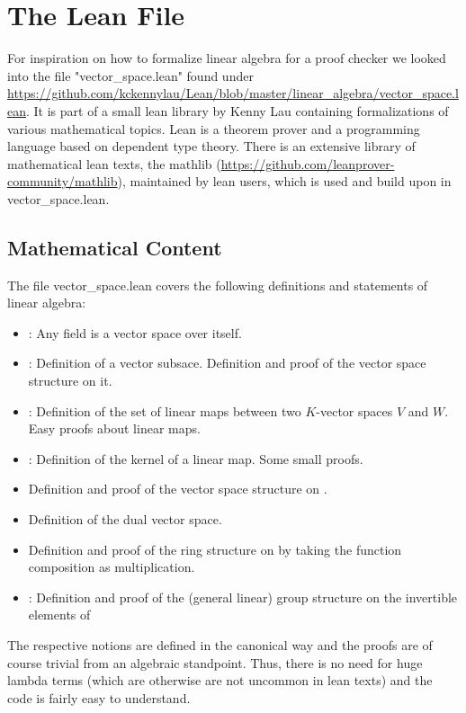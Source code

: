 \documentclass[11pt]{article}
\begin{document}
\newpage

\section{The Lean File}
For inspiration on how to formalize linear algebra for a proof checker we looked into the file "vector\_space.lean" found under \url{https://github.com/kckennylau/Lean/blob/master/linear_algebra/vector_space.lean}. It is part of a small lean library by Kenny Lau containing formalizations of various mathematical topics. Lean is a theorem prover and a programming language based on dependent type theory. There is an extensive library of mathematical lean texts, the mathlib (\url{https://github.com/leanprover-community/mathlib}), maintained by lean users, which is used and build upon in vector\_space.lean.

\subsection{Mathematical Content}
The file vector\_space.lean covers the following definitions and statements of linear algebra:
\begin{itemize}
\item {}: Any field is a vector space over itself.
\item {}: Definition of a vector subsace. Definition and proof of the vector space structure on it.
\item {}: Definition of the set of linear maps between two $K$-vector spaces $V$ and $W$. Easy proofs about linear maps.
\item {}: Definition of the kernel of a linear map. Some small proofs.
\item Definition and proof of the vector space structure on .
\item Definition of the dual vector space.
\item Definition and proof of the ring structure on  by taking the function composition as multiplication.
\item {}: Definition and proof of the (general linear) group structure on the invertible elements of 
\end{itemize}
The respective notions are defined in the canonical way and the proofs are of course trivial from an algebraic standpoint. Thus, there is no need for huge lambda terms (which are otherwise are not uncommon in lean texts) and the code is fairly easy to understand.
\end{document}
